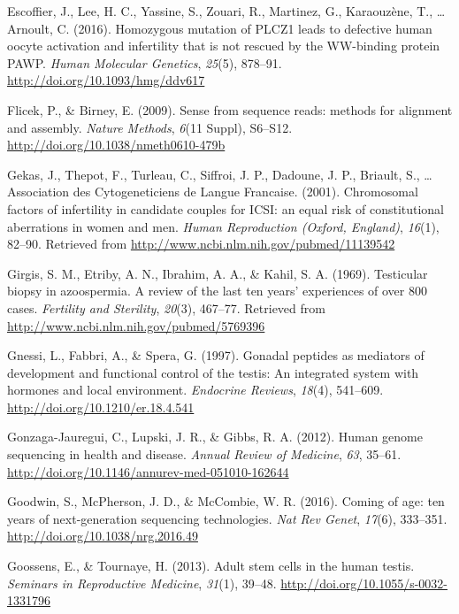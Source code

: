 \documentclass[12pt,twoside]{reedthesis}
\theoremstyle{definition}
\theoremstyle{definition}
\theoremstyle{remark}
\begin{document}
  \hypertarget{ref-Escoffier2016}{}
  Escoffier, J., Lee, H. C., Yassine, S., Zouari, R., Martinez, G.,
  Karaouzène, T., \ldots{} Arnoult, C. (2016). Homozygous mutation of
  PLCZ1 leads to defective human oocyte activation and infertility that is
  not rescued by the WW-binding protein PAWP. \emph{Human Molecular
  Genetics}, \emph{25}(5), 878--91.
  \url{http://doi.org/10.1093/hmg/ddv617}
  
  \hypertarget{ref-Flicek2009}{}
  Flicek, P., \& Birney, E. (2009). Sense from sequence reads: methods for
  alignment and assembly. \emph{Nature Methods}, \emph{6}(11 Suppl),
  S6--S12. \url{http://doi.org/10.1038/nmeth0610-479b}
  
  \hypertarget{ref-Gekas2001}{}
  Gekas, J., Thepot, F., Turleau, C., Siffroi, J. P., Dadoune, J. P.,
  Briault, S., \ldots{} Association des Cytogeneticiens de Langue
  Francaise. (2001). Chromosomal factors of infertility in candidate
  couples for ICSI: an equal risk of constitutional aberrations in women
  and men. \emph{Human Reproduction (Oxford, England)}, \emph{16}(1),
  82--90. Retrieved from \url{http://www.ncbi.nlm.nih.gov/pubmed/11139542}
  
  \hypertarget{ref-Girgis}{}
  Girgis, S. M., Etriby, A. N., Ibrahim, A. A., \& Kahil, S. A. (1969).
  Testicular biopsy in azoospermia. A review of the last ten years'
  experiences of over 800 cases. \emph{Fertility and Sterility},
  \emph{20}(3), 467--77. Retrieved from
  \url{http://www.ncbi.nlm.nih.gov/pubmed/5769396}
  
  \hypertarget{ref-Gnessi1997}{}
  Gnessi, L., Fabbri, A., \& Spera, G. (1997). Gonadal peptides as
  mediators of development and functional control of the testis: An
  integrated system with hormones and local environment. \emph{Endocrine
  Reviews}, \emph{18}(4), 541--609.
  \url{http://doi.org/10.1210/er.18.4.541}
  
  \hypertarget{ref-Gonzaga-Jauregui2012}{}
  Gonzaga-Jauregui, C., Lupski, J. R., \& Gibbs, R. A. (2012). Human
  genome sequencing in health and disease. \emph{Annual Review of
  Medicine}, \emph{63}, 35--61.
  \url{http://doi.org/10.1146/annurev-med-051010-162644}
  
  \hypertarget{ref-Goodwin2016}{}
  Goodwin, S., McPherson, J. D., \& McCombie, W. R. (2016). Coming of age:
  ten years of next-generation sequencing technologies. \emph{Nat Rev
  Genet}, \emph{17}(6), 333--351. \url{http://doi.org/10.1038/nrg.2016.49}
  
  \hypertarget{ref-Goossens2013}{}
  Goossens, E., \& Tournaye, H. (2013). Adult stem cells in the human
  testis. \emph{Seminars in Reproductive Medicine}, \emph{31}(1), 39--48.
  \url{http://doi.org/10.1055/s-0032-1331796}
  
\end{document}
